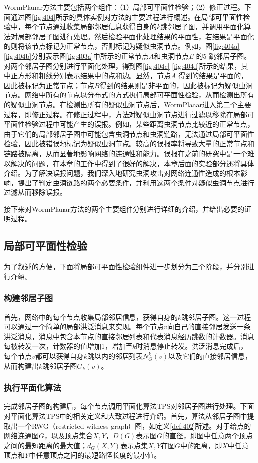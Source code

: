 WormPlanar方法主要包括两个组件：（1）局部可平面性检验；（2）修正过程。下面通过图\ref{fig:404}所示的具体实例对方法的主要过程进行概述。在局部可平面性检验中，每个节点通过收集局部邻居信息获得自身的$k$跳邻居子图，并调用平面化算法对局部邻居子图进行处理。然后检验平面化处理结果的平面性，若结果是平面化的则将该节点标记为正常节点，否则标记为疑似虫洞节点。例如，图\ref{fig:404a}-\ref{fig:404b}分别表示图\ref{fig:403a}中所示的正常节点$A$和虫洞节点$B$ 的5 跳邻居子图。对两个邻居子图分别进行平面化处理，得到图\ref{fig:404c}-\ref{fig:404d}所示的结果，其中正方形和粗线分别表示结果中的点和边。显然，节点$A$ 得到的结果是平面的，因此被标记为正常节点；节点$B$得到的结果则是非平面的，因此被标记为疑似虫洞节点。网络中所有的节点以分布式的方式执行局部可平面性检验，从而检测出所有的疑似虫洞节点。在检测出所有的疑似虫洞节点后，WormPlanar进入第二个主要过程，即修正过程。在修正过程中，方法对疑似虫洞节点进行过滤以移除在局部可平面性检验过程中可能产生的误报。例如，某些距离虫洞节点比较近的正常节点，由于它们的局部邻居子图中可能包含虫洞节点和虫洞链路，无法通过局部可平面性检验，因此被错误地标记为疑似虫洞节点。较高的误报率将导致大量的正常节点和链路被隔离，从而显著地影响网络的连通性和能力。误报在之前的研究中是一个难以解决的问题，在本章的工作中得到了很好的解决，本章后面的实验部分还将具体介绍。为了解决误报问题，我们深入地研究虫洞攻击对网络连通性造成的根本影响，提出了判定虫洞链路的两个必要条件，并利用这两个条件对疑似虫洞节点进行过滤从而移除误报。

接下来对WormPlanar方法的两个主要组件分别进行详细的介绍，并给出必要的证明过程。
\subsection{局部可平面性检验}
为了叙述的方便，下面将局部可平面性检验组件进一步划分为三个阶段，并分别进行介绍。
\subsubsection{构建邻居子图}
首先，网络中的每个节点收集局部邻居信息，获得自身的$k$跳邻居子图。这一过程可以通过一个简单的局部洪泛消息来实现。每个节点$v$向自己的直接邻居发送一条洪泛消息，消息中包含本节点的直接邻居列表和代表消息经历跳数的计数器。消息每被转发一次，计数器的值增加1，增加至$k$时消息停止转发。洪泛消息完成后，每个节点$v$都可以获得自身$k$跳以内的邻居列表$N_G^k(v)$以及它们的直接邻居信息，从而构建出$k$跳邻居子图$G_k(v)$。
\subsubsection{执行平面化算法}
完成邻居子图的构建后，每个节点调用平面化算法TPS对邻居子图进行处理。下面对平面化算法TPS中的相关定义和大致过程进行介绍。首先，算法从邻居子图中提取出一个RWG（restricted witness graph）图，如定义\ref{def:402}所述。对于给点的网络连通图$G$，以及顶点集合$X,Y$，$D(G)$表示图$G$的直径，即图中任意两个顶点之间的最短距离的最大值；$d_G(X,Y)$表示点集$X,Y$在图$G$中的距离，即$X$中任意顶点和$Y$中任意顶点之间的最短路径长度的最小值。

